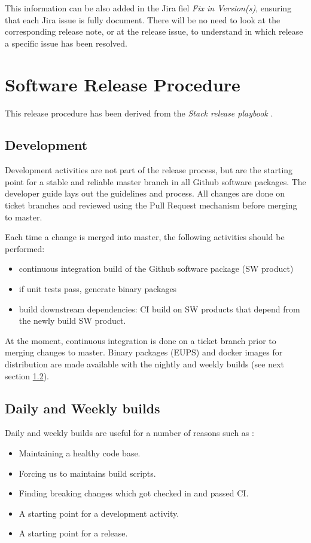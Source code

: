 This information can be also added in the Jira fiel \textit{Fix in Version(s)}, ensuring that each Jira issue is fully document. 
There will be no need to look at the corresponding release note, or at the release issue, to understand in which release a specific issue has been resolved.


\newpage
\section{Software Release Procedure} \label{sec:releaseprocedure}

This release procedure has been derived from the \textit{Stack release playbook} .

\subsection{Development} \label{sec:dev}

Development activities are not part of the release process, but are the starting point for a stable and reliable master branch in all Github software packages.
The  developer guide lays out the guidelines and process. All changes are done on ticket branches and reviewed using the Pull Request mechanism before merging to master.

Each time a change is merged into master, the following activities should be performed:

\begin{itemize}
\item continuous integration build of the Github software package (SW product)
\item if unit tests pass, generate binary packages
\item build downstream dependencies: CI build on SW products that depend from the newly build SW product.
\end{itemize}

At the moment, continuous integration is done on a ticket branch prior to merging changes to master. Binary packages (EUPS) and docker images for distribution are made available with the nightly and weekly builds (see next section \ref{sec:weekly}).


\subsection{Daily and Weekly builds} \label{sec:weekly}

Daily and weekly builds are  useful for a number of reasons such as :
\begin{itemize}
	\item Maintaining a healthy code base.
	\item Forcing us to maintains build scripts.
	\item Finding breaking changes which got checked in and passed CI.
	\item A starting point for a development activity.
	\item A starting point for a release.
\end{itemize}

